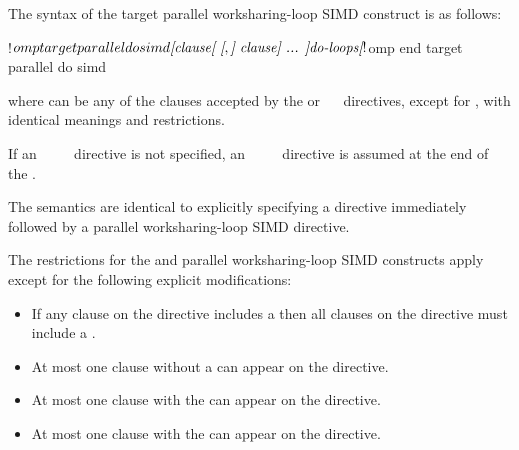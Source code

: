 \begin{fortranspecific}
The syntax of the target parallel worksharing-loop SIMD construct is as follows:

\begin{ompfPragma}
!$omp target parallel do simd \plc{[clause[ [},\plc{] clause] ... ]}
    \plc{do-loops}
\plc{[}!$omp end target parallel do simd\plc{]}
\end{ompfPragma}

where  can be any of the clauses accepted by the  or
~~ directives, except for , with identical meanings and restrictions.

If an ~~~~ directive is not specified, an
~~~~ directive is assumed at the end of
the .
\end{fortranspecific}

\descr
The semantics are identical to explicitly specifying a  directive
immediately followed by a parallel worksharing-loop SIMD directive.


\restrictions
The restrictions for the  and parallel worksharing-loop SIMD constructs apply except for the following explicit modifications:

\begin{itemize}
\item If any  clause on the directive includes a
       then all  clauses
      on the directive must include a .

\item At most one  clause without a
       can appear on the directive.

\item At most one  clause with the 
       can appear on the directive.


\item At most one  clause with the 
       can appear on the directive.
\end{itemize}

